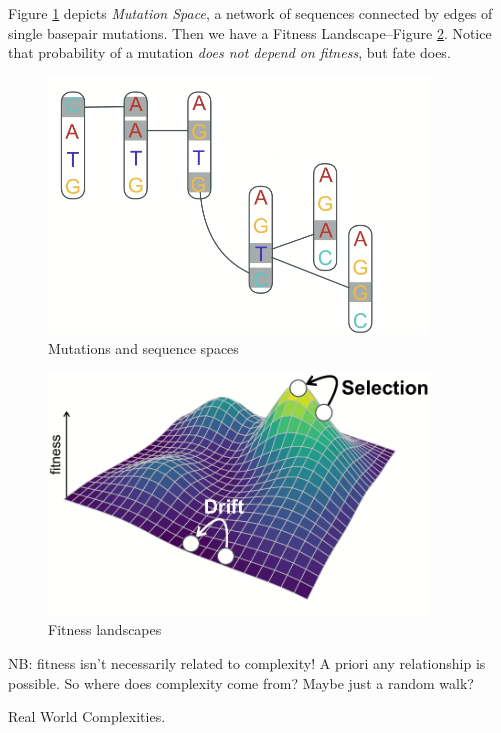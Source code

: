 \documentclass[]{article}
\begin{document}
Figure \ref{fig:MutationSpace} depicts \textit{Mutation Space}, a network of sequences connected by edges of single basepair mutations. Then we have a Fitness Landscape--Figure \ref{fig:FitnessLandscapeMovement}. Notice that probability of a mutation \textit{does not depend on fitness}, but fate does.
\begin{figure}[H]
	\caption{Mutations and sequence spaces}\label{fig:MutationSpace}
	\includegraphics[width=0.9\textwidth]{MutationSpace}
\end{figure}

\begin{figure}[H]
	\caption{Fitness landscapes}\label{fig:FitnessLandscapeMovement}
	\includegraphics[width=0.9\textwidth]{FitnessLandscapeMovement}
\end{figure}

NB: fitness isn't necessarily related to complexity! A priori any relationship is possible. So where does complexity come from? Maybe just a random walk?

Real World Complexities.
\end{document}
